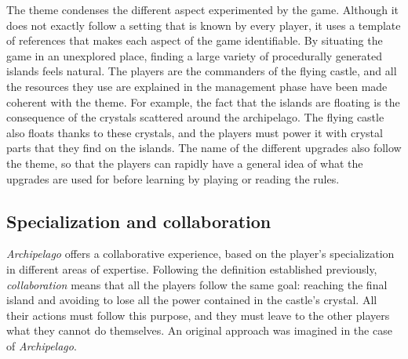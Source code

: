 The theme condenses the different aspect experimented by the game. Although it does not exactly follow a setting that is known by every player, it uses a template of references that makes each aspect of the game identifiable. By situating the game in an unexplored place, finding a large variety of procedurally generated islands feels natural. The players are the commanders of the flying castle, and all the resources they use are explained in the management phase have been made coherent with the theme. For example, the fact that the islands are floating is the consequence of the crystals scattered around the archipelago. The flying castle also floats thanks to these crystals, and the players must power it with crystal parts that they find on the islands. The name of the different upgrades also follow the theme, so that the players can rapidly have a general idea of what the upgrades are used for before learning by playing or reading the rules.
\subsection{Specialization and collaboration}
\textit{Archipelago} offers a collaborative experience, based on the player's specialization in different areas of expertise. Following the definition established previously, \textit{collaboration} means that all the players follow the same goal: reaching the final island and avoiding to lose all the power contained in the castle's crystal. All their actions must follow this purpose, and they must leave to the other players what they cannot do themselves. An original approach was imagined in the case of \textit{Archipelago}.
